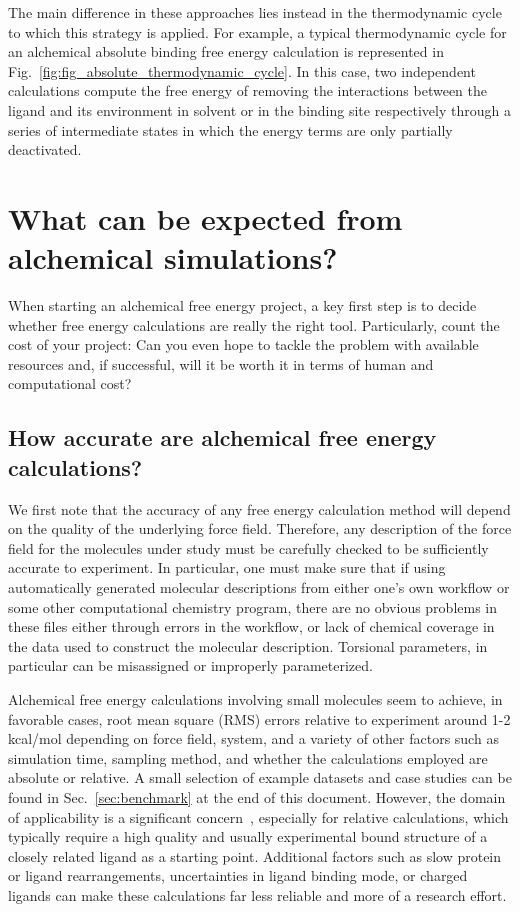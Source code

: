 \documentclass[9pt,bestpractices]{livecoms}
\begin{document}
The main difference in these approaches lies instead in the thermodynamic cycle to which this strategy is applied.
For example, a typical thermodynamic cycle for an alchemical absolute binding free energy calculation is represented in Fig.~\ref{fig:fig_absolute_thermodynamic_cycle}.
In this case, two independent calculations compute the free energy of removing the interactions between the ligand and its environment in solvent or in the binding site respectively through a series of intermediate states in which the energy terms are only partially deactivated.




\section{What can be expected from alchemical simulations?}
\label{sec:step0}
When starting an alchemical free energy project, a key first step is to decide whether free energy calculations are really the right tool. Particularly, count the cost of your
project: Can you even hope to tackle the problem with available resources and, if successful, will it
be worth it in terms of human and computational cost?

\subsection{How accurate are alchemical free energy calculations?}
\label{subsec:expectation}
We first note that the accuracy of any free energy calculation method will depend on the quality of the underlying force field.  Therefore, any description of the force field for the molecules under study must be carefully checked to be sufficiently accurate to experiment. In particular, one must make sure that if using automatically generated molecular descriptions from either one's own workflow or some other computational chemistry program, there are no obvious problems in these files either through errors in the workflow, or lack of chemical coverage in the data used to construct the molecular description. Torsional parameters, in particular can be misassigned or improperly parameterized. 

Alchemical free energy calculations involving small molecules seem to achieve, in favorable cases, root mean square (RMS) errors relative to experiment around 1-2 kcal/mol depending on force field, system, and a variety of other factors such as simulation time, sampling method, and whether the calculations employed are absolute or relative. A small selection of example datasets and case studies can be found in Sec.~\ref{sec:benchmark} at the end of this document.
However, the domain of applicability is a significant concern~\cite{sherborne2016collaborating, cournia2017relative}, especially for relative calculations, which typically require a high quality and usually experimental bound structure of a closely
related ligand as a starting point. Additional factors such as slow protein or ligand rearrangements, uncertainties in ligand binding mode, or charged ligands can make these calculations far less reliable and more of a research effort.
\end{document}

